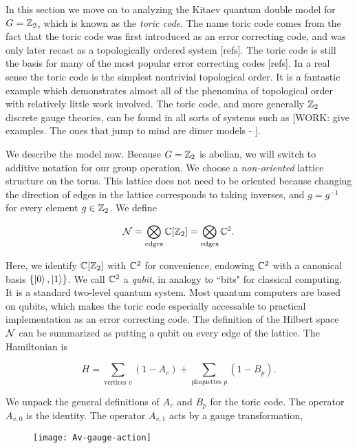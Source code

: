 In this section we move on to analyzing the Kitaev quantum double model for $G=\mathbb{Z}_2$, which is known as the \textit{toric code}. The name toric code comes from the fact that the toric code was first introduced as an error correcting code, and was only later recast as a topologically ordered system [refs]. The toric code is still the basis for many of the most popular error correcting codes [refs]. In a real sense the toric code is the simplest nontrivial topological order. It is a fantastic example which demonstrates almost all of the phenomina of topological order with relatively little work involved. The toric code, and more generally $\mathbb{Z}_2$ discrete gauge theories, can be found in all sorts of systems such as [WORK: give examples. The ones that jump to mind are dimer models - \cite{moessner2001resonating, misguich2002quantum}]. 

We describe the model now. Because $G=\mathbb{Z}_2$ is abelian, we will switch to additive notation for our group operation. We choose a \textit{non-oriented} lattice structure on the torus. This lattice does not need to be oriented because changing the direction of edges in the lattice corresponds to taking inverses, and $g=g^{-1}$ for every element $g\in \mathbb{Z}_2$. We define

$$\mathcal{N} = \bigotimes_{\text{edges}}\mathbb{C}[\mathbb{Z}_2]=\bigotimes_{\text{edges}}\mathbb{C}^2.$$

Here, we identify $\mathbb{C}[\mathbb{Z}_2]$ with $\mathbb{C}^2$ for convenience, endowing $\mathbb{C}^2$ with a canonical basis $\{\ket{0},\ket{1}\}$. We call $\mathbb{C}^2$ a \textit{qubit}, in analogy to ``bits" for classical computing. It is a standard two-level quantum system. Most quantum computers are based on qubits, which makes the toric code especially accessable to practical implementation as an error correcting code. The definition of the Hilbert space $\mathcal{N}$ can be summarized as putting a qubit on every edge of the lattice. The Hamiltonian is

$$H=\sum_{\text{vertices }v}(1-A_v)+\sum_{\text{plaquettes }p}(1-B_p).$$

We unpack the general definitions of $A_v$ and $B_p$ for the toric code. The operator $A_{v,0}$ is the identity. The operator $A_{v,1}$ acts by a gauge transformation,

\begin{figure}[h]
\begin{center}
\texttt{[image: Av-gauge-action]}
\end{center}
\end{figure}

